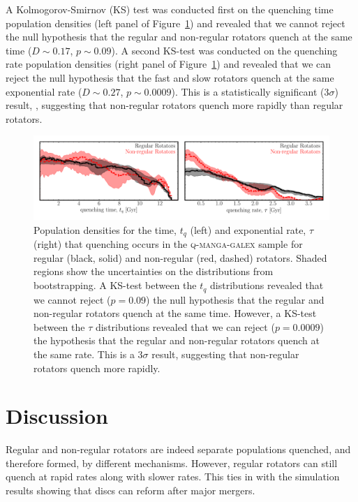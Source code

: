 \documentclass[useAMS,usenatbib]{mn2e}
\begin{document}
A Kolmogorov-Smirnov (KS) test was conducted first on the quenching time population densities (left panel of Figure~\ref{fig:popfrvsr}) and revealed that we cannot reject the null hypothesis that the regular and non-regular rotators quench at the same time ($D \sim 0.17$, $p \sim 0.09$). A second KS-test was conducted on the quenching rate population densities (right panel of Figure~\ref{fig:popfrvsr}) and revealed that we can reject the null hypothesis that the fast and slow rotators quench at the same exponential rate ($D \sim 0.27$, $p \sim 0.0009$). This is a statistically significant ($3\sigma$) result, , suggesting that non-regular rotators quench more rapidly than regular rotators.

\begin{figure}
\centering
\includegraphics[width=\textwidth]{../figures/quenching_time_rate_FR_SR_NSF_C16.pdf}
\caption{Population densities for the time, $t_q$ (left) and exponential rate, $\tau$ (right) that quenching occurs in the \textsc{q-manga-galex} sample for regular (black, solid) and non-regular (red, dashed) rotators. Shaded regions show the uncertainties on the distributions from bootstrapping. A KS-test between the $t_q$ distributions revealed that we cannot reject ($p=0.09$) the null hypothesis that the regular and non-regular rotators quench at the same time. However, a KS-test between the $\tau$ distributions revealed that we can reject ($p=0.0009$) the hypothesis that the regular and non-regular rotators quench at the same rate. This is a $3\sigma$ result, suggesting that non-regular rotators quench more rapidly.}
\label{fig:popfrvsr}
\end{figure}

\section{Discussion}\label{sec:discussion}

Regular and non-regular rotators are indeed separate populations quenched, and therefore formed, by different mechanisms. However, regular rotators can still quench at rapid rates along with slower rates. This ties in with the simulation results showing that discs can reform after major mergers. 


  
\end{document}
